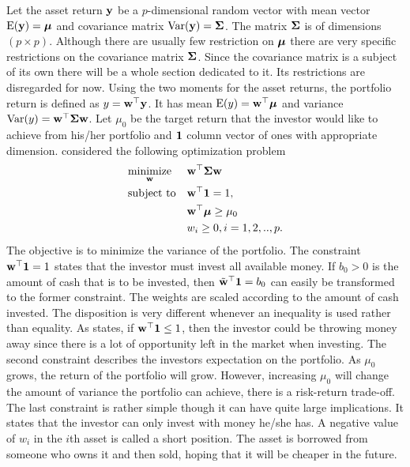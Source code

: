 \documentclass[12pt, oneside]{book}\usepackage{knitr}
\begin{document}
{Let the asset return $\mathbf{y}$ be a $p$-dimensional random vector with mean vector $\operatorname{E}(\mathbf{y})=\mbox{\boldmath$\mu$}$ and covariance matrix $\operatorname{Var}(\mathbf{y})=\mathbf{\Sigma}$. 
The matrix $\mathbf{\Sigma}$ is of dimensions $(p \times p)$. 
Although there are usually few restriction on $\mbox{\boldmath$\mu$}$ there are very specific restrictions on the covariance matrix $\mathbf{\Sigma}$. 
Since the covariance matrix is a subject of its own there will be a whole section dedicated to it.
Its restrictions are disregarded for now.
Using the two moments for the asset returns, the portfolio return is defined as $y = \mathbf{w}^\top \mathbf{y}$.
It has mean $\operatorname{E}(y)=\mathbf{w}^\top \mbox{\boldmath$\mu$}$ and variance $\operatorname{Var}(y)=\mathbf{w}^\top \mathbf{\Sigma} \mathbf{w}$. 
Let $\mu_0$ be the target return that the investor would like to achieve from his/her portfolio and $\mathbf{1}$ column vector of ones with appropriate dimension. 
\citet{markowitz1959portfolio} considered the following optimization problem
\begin{equation}\label{eqn:markowitz_optim}
\begin{aligned}
& \underset{\mathbf{w}}{\text{minimize}} 
& & \mathbf{w}^\top \mathbf{\Sigma} \mathbf{w} \\
& \text{subject to}
& & \mathbf{w}^\top \mathbf{1} = 1, \\
& && \mathbf{w}^\top \mbox{\boldmath$\mu$} \geq \mu_0 \\
&&& w_i \geq 0, i=1,2,..,p.
\end{aligned}
\end{equation}
The objective is to minimize the variance of the portfolio. 
The constraint $\mathbf{w}^\top \mathbf{1} = 1$ states that the investor must invest all available money.
If $b_0>0$ is the amount of cash that is to be invested, then $\tilde{\mathbf{w}}^\top\mathbf{1} = b_0$ can easily be transformed to the former constraint.
The weights are scaled according to the amount of cash invested.
The disposition is very different whenever an inequality is used rather than equality.
As \citet{hult2012risk} states, if $\mathbf{w}^\top \mathbf{1} \leq 1$, then the investor could be throwing money away since there is a lot of opportunity left in the market when investing.
The second constraint describes the investors expectation on the portfolio.
As $\mu_0$ grows, the return of the portfolio will grow. 
However, increasing $\mu_0$ will change the amount of variance the portfolio can achieve, there is a risk-return trade-off. 
The last constraint is rather simple though it can have quite large implications. 
It states that the investor can only invest with money he/she has. 
A negative value of $w_i$ in the $i$th asset is called a short position.
The asset is borrowed from someone who owns it and then sold, hoping that it will be cheaper in the future.
}
\end{document}
